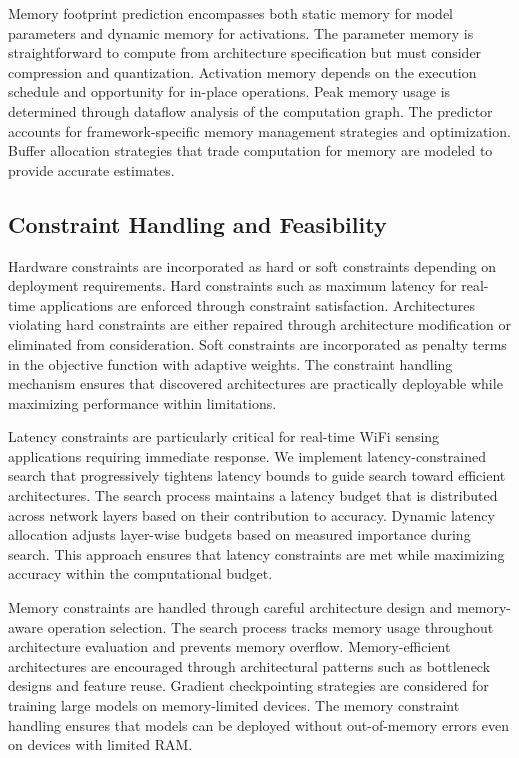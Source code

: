 \documentclass[journal]{IEEEtran}
\begin{document}
Memory footprint prediction encompasses both static memory for model parameters and dynamic memory for activations. The parameter memory is straightforward to compute from architecture specification but must consider compression and quantization. Activation memory depends on the execution schedule and opportunity for in-place operations. Peak memory usage is determined through dataflow analysis of the computation graph. The predictor accounts for framework-specific memory management strategies and optimization. Buffer allocation strategies that trade computation for memory are modeled to provide accurate estimates.

\subsection{Constraint Handling and Feasibility}

Hardware constraints are incorporated as hard or soft constraints depending on deployment requirements. Hard constraints such as maximum latency for real-time applications are enforced through constraint satisfaction. Architectures violating hard constraints are either repaired through architecture modification or eliminated from consideration. Soft constraints are incorporated as penalty terms in the objective function with adaptive weights. The constraint handling mechanism ensures that discovered architectures are practically deployable while maximizing performance within limitations.

Latency constraints are particularly critical for real-time WiFi sensing applications requiring immediate response. We implement latency-constrained search that progressively tightens latency bounds to guide search toward efficient architectures. The search process maintains a latency budget that is distributed across network layers based on their contribution to accuracy. Dynamic latency allocation adjusts layer-wise budgets based on measured importance during search. This approach ensures that latency constraints are met while maximizing accuracy within the computational budget.

Memory constraints are handled through careful architecture design and memory-aware operation selection. The search process tracks memory usage throughout architecture evaluation and prevents memory overflow. Memory-efficient architectures are encouraged through architectural patterns such as bottleneck designs and feature reuse. Gradient checkpointing strategies are considered for training large models on memory-limited devices. The memory constraint handling ensures that models can be deployed without out-of-memory errors even on devices with limited RAM.
\end{document}

